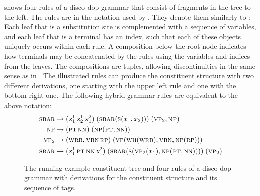 \documentclass[../../document.tex]{subfiles}
\begin{document}
    \begin{example}\label{ex:dop}
         shows four rules of a disco-dop grammar that consist of fragments in the tree to the left.
        The rules are in the notation used by \citet{CraSchBod16}.
        They denote them similarly to :
            Each leaf that is a substitution site is complemented with a sequence of variables, and each leaf that is a terminal has an index, such that each of these objects uniquely occurs within each rule.
            A composition below the root node indicates how terminals may be concatenated by the rules using the variables and indices from the leaves.
            The compositions are tuples, allowing discontinuities in the same sense as in .
        The illustrated rules can produce the constituent structure with two different derivations, one starting with the upper left rule and one with the bottom right one.
        The following hybrid grammar rules are equivalent to the above notation: \begin{align*}
            \textsc{sbar} &\to (\textsl{x}_1^1 \, \textsl{x}_2^1 \, \textsl{x}_1^2)\;(\textsc{sbar} (\textsc{s} (x_1, x_2)))\;(\textsc{vp}_2, \textsc{np}) \\
            \textsc{np} &\to (\textsc{pt} \, \textsc{nn})\;(\textsc{np} (\textsc{pt}, \textsc{nn})) \\
            \textsc{vp}_2 &\to (\textsc{wrb}, \textsc{vbn} \, \textsc{rp})\;(\textsc{vp} (\textsc{wh}(\textsc{wrb}),\textsc{vbn},\textsc{np}(\textsc{rp}))) \\
            \textsc{sbar} &\to (\textsl{x}_1^1 \, \textsc{pt} \, \textsc{nn} \, \textsl{x}_1^2)\;(\textsc{sbar} (\textsc{s} (\textsc{vp}_2(x_1),\textsc{np}(\textsc{pt}, \textsc{nn}))))\;(\textsc{vp}_2)
        \end{align*}
    \end{example}
    
    \begin{figure}
        \null\hfill
        
        \hspace{1cm}
        
        \hfill\null
        \caption{\label{fig:ex:dop}
            The running example constituent tree and four rules of a disco-dop grammar with derivations for the constituent structure and its sequence of  tags.}
    \end{figure}
\end{document}

